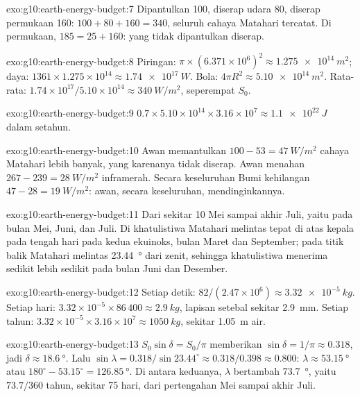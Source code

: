\begin{solution}{exo:g10:earth-energy-budget:7}
Dipantulkan 100, diserap udara 80, diserap permukaan 160:
$100 + 80 + 160 = 340$, seluruh cahaya Matahari tercatat. Di permukaan,
$185 = 25 + 160$: yang tidak dipantulkan diserap.
\end{solution}

\begin{solution}{exo:g10:earth-energy-budget:8}
Piringan: $\pi \times (6.371\times10^6)^2 \approx \qty{1.275e14}{m^2}$; daya:
$1361 \times 1.275\times10^{14} \approx \qty{1.74e17}{W}$. Bola: $4\pi
R^2 \approx \qty{5.10e14}{m^2}$. Rata-rata: $1.74\times10^{17}/5.10\times
10^{14} \approx \qty{340}{W/m^2}$, seperempat $S_0$.
\end{solution}

\begin{solution}{exo:g10:earth-energy-budget:9}
$0.7 \times 5.10\times10^{14} \times 3.16\times10^7 \approx
\qty{1.1e22}{J}$ dalam setahun.
\end{solution}

\begin{solution}{exo:g10:earth-energy-budget:10}
Awan memantulkan $100 - 53 = \qty{47}{W/m^2}$ cahaya Matahari lebih banyak,
yang karenanya tidak diserap. Awan menahan $267 - 239 = \qty{28}{W/m^2}$
inframerah. Secara keseluruhan Bumi kehilangan $47 - 28 = \qty{19}{W/m^2}$:
awan, secara keseluruhan, mendinginkannya.
\end{solution}

\begin{solution}{exo:g10:earth-energy-budget:11}
Dari sekitar 10 Mei sampai akhir Juli, yaitu pada bulan Mei, Juni, dan Juli.
Di khatulistiwa Matahari melintas tepat di atas kepala pada tengah hari pada
kedua ekuinoks, bulan Maret dan September; pada titik balik Matahari melintas
\qty{23.44}{\degree} dari zenit, sehingga khatulistiwa menerima sedikit lebih
sedikit pada bulan Juni dan Desember.
\end{solution}

\begin{solution}{exo:g10:earth-energy-budget:12}
Setiap detik: $82/(2.47\times10^6) \approx \qty{3.32e-5}{kg}$. Setiap hari:
$3.32\times10^{-5} \times 86\,400 \approx \qty{2.9}{kg}$, lapisan setebal
sekitar \qty{2.9}{mm}. Setiap tahun: $3.32\times10^{-5} \times 3.16\times10^7 \approx
\qty{1050}{kg}$, sekitar \qty{1.05}{m} air.
\end{solution}

\begin{solution}{exo:g10:earth-energy-budget:13}
$S_0 \sin\delta = S_0/\pi$ memberikan $\sin\delta = 1/\pi \approx 0.318$, jadi
$\delta \approx \qty{18.6}{\degree}$. Lalu $\sin\lambda = 0.318/\sin 23.44^\circ
\approx 0.318/0.398 \approx 0.800$: $\lambda \approx \qty{53.15}{\degree}$ atau
$180^\circ - 53.15^\circ = \qty{126.85}{\degree}$. Di antara keduanya, $\lambda$
bertambah \qty{73.7}{\degree}, yaitu $73.7/360$ tahun, sekitar
\num{75} hari, dari pertengahan Mei sampai akhir Juli.
\end{solution}


